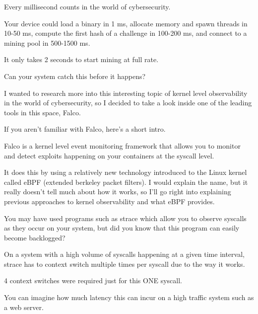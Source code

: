 

\newcommand{\DocTitle}{When Miliseconds Matter}
\newcommand{\DocDescription}{man i don't have enough context switches to spare}
\newcommand{\DocTags}{writeup, linux, eBPF, observability}




Every millisecond counts in the world of cybersecurity.

Your device could load a binary in \tildechar{}1 ms, allocate memory and spawn threads in \tildechar{}10-50 ms, compute the first hash of a challenge in \tildechar{}100-200 ms, and connect to a mining pool in \tildechar{}500-1500 ms.

It only takes \tildechar{}2 seconds to start mining at full rate.

Can your system catch this before it happens?

I wanted to research more into this interesting topic of kernel level observability in the world of cybersecurity, so I decided to take a look inside one of the leading tools in this space, Falco.

If you aren't familiar with Falco, here's a short intro.

Falco is a kernel level event monitoring framework that allows you to monitor and detect exploits happening on your containers at the syscall level.

It does this by using a relatively new technology introduced to the Linux kernel called eBPF (extended berkeley packet filters). I would explain the name, but it really doesn't tell much about how it works, so I'll go right into explaining previous approaches to kernel observability and what eBPF provides.

You may have used programs such as strace which allow you to observe syscalls as they occur on your system, but did you know that this program can easily become backlogged?

On a system with a high volume of syscalls happening at a given time interval, strace has to context switch multiple times per syscall due to the way it works.


4 context switches were required just for this ONE syscall.

You can imagine how much latency this can incur on a high traffic system such as a web server.


